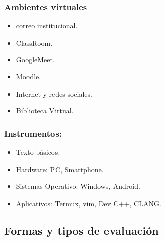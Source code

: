 \documentclass[a4pa<per,12pt,spanish]{article}
\newcommand{\cmark}{\ding{51}}%
\newcommand{\xmark}{\ding{55}}%
\newcommand{\done}{\rlap{$\square$}{\raisebox{2pt}{\large\hspace{1pt}\cmark}}%
\hspace{-2.5pt}}
\newcommand{\wontfix}{\rlap{$\square$}{\large\hspace{1pt}\xmark}}
\begin{document}
\subsubsection{Ambientes virtuales}
\label{sec:ambientes-virtuales}
\begin{itemize}
\item [\done] correo institucional.
\item [\wontfix] ClassRoom.
\item [\done] GoogleMeet.
\item [\done] Moodle.
\item [\done] Internet y redes sociales.
\item [\done] Biblioteca Virtual.
\end{itemize}

\subsubsection{Instrumentos:}
\label{sec:instrumentos}

\begin{itemize}
\item [\done] Texto básicos.
\item [\done] Hardware: PC, Smartphone.
\item [\done] Sistemas Operativo:  Windows, Android.
\item [\done] Aplicativos: Termux, vim, Dev C++, CLANG.
\end{itemize}



\subsection{Formas y tipos de evaluación}
\label{sec:formas-y-tipos}
\end{document}
